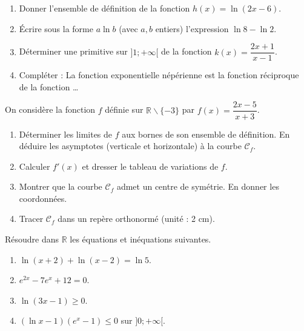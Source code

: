 \documentclass[11pt]{article}
\newcounter{popsec}
\newcounter{popsub}
\newcommand{\courssub}[1]{%
  \stepcounter{popsub}%
  \par\vspace{9pt}\noindent{\popxbold\fontsize{11.5}{13}\selectfont\color{popink}{\color{poporange}\thepopsec.\thepopsub}\hspace{6pt}#1}\par\nopagebreak\vspace{4pt}
}
\def\setminus{\mathbin{\backslash}}\let\smallsetminus\setminus
\begin{document}
\begin{exercice}
\begin{enumerate}
    \item Donner l'ensemble de définition de la fonction $h(x) = \ln(2x-6)$.
    \item Écrire sous la forme $a\ln b$ (avec $a,b$ entiers) l'expression $\ln 8 - \ln 2$.
    \item Déterminer une primitive sur $]1;+\infty[$ de la fonction $k(x) = \dfrac{2x+1}{x-1}$.
    \item Compléter : La fonction exponentielle népérienne est la fonction réciproque de la fonction \ldots
\end{enumerate}
\end{exercice}

\courssub{Je m'entraîne}

\begin{exercice}
On considère la fonction $f$ définie sur $\mathbb{R}\setminus\{-3\}$ par $f(x) = \dfrac{2x-5}{x+3}$.
\begin{enumerate}
    \item Déterminer les limites de $f$ aux bornes de son ensemble de définition. En déduire les asymptotes (verticale et horizontale) à la courbe $\mathcal{C}_f$.
    \item Calculer $f'(x)$ et dresser le tableau de variations de $f$.
    \item Montrer que la courbe $\mathcal{C}_f$ admet un centre de symétrie. En donner les coordonnées.
    \item Tracer $\mathcal{C}_f$ dans un repère orthonormé (unité : 2 cm).
\end{enumerate}
\end{exercice}

\begin{exercice}
Résoudre dans $\mathbb{R}$ les équations et inéquations suivantes.
\begin{enumerate}
    \item $\ln(x+2) + \ln(x-2) = \ln 5$.
    \item $e^{2x} - 7e^x + 12 = 0$.
    \item $\ln(3x-1) \ge 0$.
    \item $(\ln x - 1)(e^x - 1) \le 0$ sur $]0;+\infty[$.
\end{enumerate}
\end{exercice}
\end{document}
